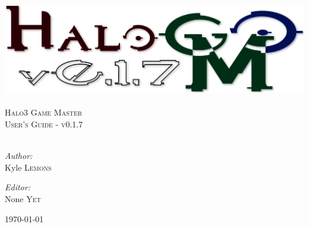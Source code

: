 \begin{titlepage}
 
\begin{center}
 
 
\includegraphics[width=1\textwidth]{./VersionLogo}\\[2.5cm]
 
\HRule \\[0.4cm]
\textsc{\LARGE Halo3 Game Master}\\[0.2cm]
\textsc{\Large User's Guide - v0.1.7}\\[0.1cm]
\HRule \\[1.5cm]
 
\begin{minipage}{0.4\textwidth}
\begin{flushleft} \large
\emph{Author:}\\
Kyle \textsc{Lemons}
\end{flushleft}
\end{minipage}
\begin{minipage}{0.4\textwidth}
\begin{flushright} \large
\emph{Editor:} \\
None \textsc{Yet}
\end{flushright}
\end{minipage}
 
\vfill
 
{\large \today}
 
\end{center}
 
\end{titlepage}
